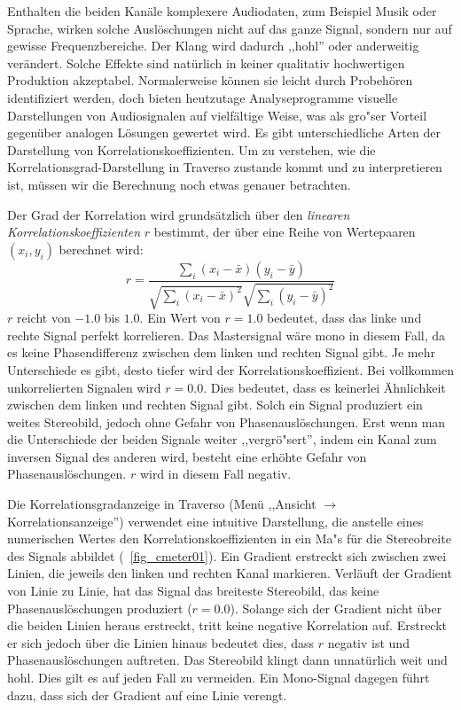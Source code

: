 Enthalten die beiden Kanäle komplexere Audiodaten, zum Beispiel Musik oder Sprache, wirken solche Auslöschungen nicht auf das ganze Signal, sondern nur auf gewisse Frequenzbereiche. Der Klang wird dadurch ,,hohl'' oder anderweitig verändert. Solche Effekte sind natürlich in keiner qualitativ hochwertigen Produktion akzeptabel. Normalerweise können sie leicht durch Probehören identifiziert werden, doch bieten heutzutage Analyseprogramme visuelle Darstellungen von Audiosignalen auf vielfältige Weise, was als gro"ser Vorteil gegenüber analogen Lösungen gewertet wird. Es gibt unterschiedliche Arten der Darstellung von Korrelationskoeffizienten. Um zu verstehen, wie die Korrelationsgrad-Darstellung in Traverso zustande kommt und zu interpretieren ist, müssen wir die Berechnung noch etwas genauer betrachten.

Der Grad der Korrelation wird grundsätzlich über den \emph{linearen Korrelationskoeffizienten} $r$ bestimmt, der über eine Reihe von Wertepaaren $(x_i,y_i)$ berechnet wird:
\[
r = \frac{\sum\limits_{i}(x_i - \bar{x})(y_i - \bar{y})}{\sqrt{\sum\limits_{i}(x_i - \bar{x})^2} \sqrt{\sum\limits_{i}(y_i - \bar{y})^2}}
\]
$r$ reicht von $-1.0$ bis $1.0$. Ein Wert von $r = 1.0$ bedeutet, dass das linke und rechte Signal perfekt korrelieren. Das Mastersignal wäre mono in diesem Fall, da es keine Phasendifferenz zwischen dem linken und rechten Signal gibt. Je mehr Unterschiede es gibt, desto tiefer wird der Korrelationskoeffizient. Bei vollkommen unkorrelierten Signalen wird $r = 0.0$. Dies bedeutet, dass es keinerlei Ähnlichkeit zwischen dem linken und rechten Signal gibt. Solch ein Signal produziert ein weites Stereobild, jedoch ohne Gefahr von Phasenauslöschungen. Erst wenn man die Unterschiede der beiden Signale weiter ,,vergrö"sert'', indem ein Kanal zum inversen Signal des anderen wird, besteht eine erhöhte Gefahr von Phasenauslöschungen. $r$ wird in diesem Fall negativ.

Die Korrelationsgradanzeige in Traverso (Menü ,,Ansicht $\rightarrow$ Korrelationsanzeige'') verwendet eine intuitive Darstellung, die anstelle eines numerischen Wertes den Korrelationskoeffizienten in ein Ma"s für die Stereobreite des Signals abbildet (\FigB\ \ref{fig_cmeter01}). Ein Gradient erstreckt sich zwischen zwei Linien, die jeweils den linken und rechten Kanal markieren. Verläuft der Gradient von Linie zu Linie, hat das Signal das breiteste Stereobild, das keine Phasenauslöschungen produziert ($r = 0.0$). Solange sich der Gradient nicht über die beiden Linien heraus erstreckt, tritt keine negative Korrelation auf. Erstreckt er sich jedoch über die Linien hinaus bedeutet dies, dass $r$ negativ ist und Phasenauslöschungen auftreten. Das Stereobild klingt dann unnatürlich weit und hohl. Dies gilt es auf jeden Fall zu vermeiden. Ein Mono-Signal dagegen führt dazu, dass sich der Gradient auf eine Linie verengt.

